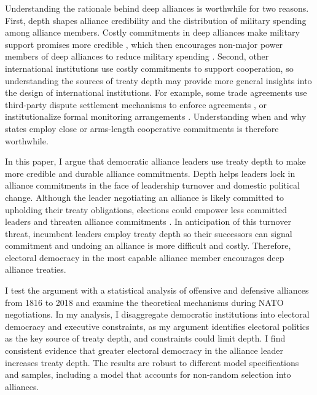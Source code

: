 \documentclass[12pt]{article}
\begin{document}
Understanding the rationale behind deep alliances is worthwhile for two reasons.
First, depth shapes alliance credibility and the distribution of military spending among alliance members. 
Costly commitments in deep alliances make military support promises more credible \citep{Morrow1994}, which then encourages non-major power members of deep alliances to reduce military spending \citep{Alley2020}.  
Second, other international institutions use costly commitments to support cooperation, so understanding the sources of treaty depth may provide more general insights into the design of international institutions.  
For example, some trade agreements use third-party dispute settlement mechanisms to enforce agreements \citep{Smith2000}, or institutionalize formal monitoring arrangements \citep{Duretal2013}.  
Understanding when and why states employ close or arms-length cooperative commitments is therefore worthwhile. 


In this paper, I argue that democratic alliance leaders use treaty depth to make more credible and durable alliance commitments. 
Depth helps leaders lock in alliance commitments in the face of leadership turnover and domestic political change. 
Although the leader negotiating an alliance is likely committed to upholding their treaty obligations, elections could empower less committed leaders and threaten alliance commitments \citep{GartzkeGleditsch2004, LeedsSavun2007, Leedsetal2009}.
In anticipation of this turnover threat, incumbent leaders employ treaty depth so their successors can signal commitment and undoing an alliance is more difficult and costly. 
Therefore, electoral democracy in the most capable alliance member encourages deep alliance treaties. 


I test the argument with a statistical analysis of offensive and defensive alliances from 1816 to 2018 and examine the theoretical mechanisms during NATO negotiations.
In my analysis, I disaggregate democratic institutions into electoral democracy and executive constraints, as my argument identifies electoral politics as the key source of treaty depth, and constraints could limit depth. 
I find consistent evidence that greater electoral democracy in the alliance leader increases treaty depth. 
The results are robust to different model specifications and samples, including a model that accounts for non-random selection into alliances. 
\end{document}
